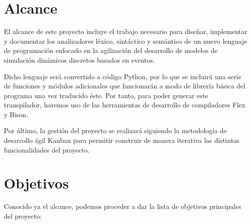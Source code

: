 \section{Alcance}



El alcance de este proyecto incluye el trabajo necesario para diseñar,
implementar y documentar los analizadores léxico, sintáctico y semántico de un
nuevo lenguaje de programación enfocado en la agilización del desarrollo de
modelos de simulación dinámicos discretos basados en eventos.


Dicho lenguaje será convertido a código Python, por lo que se incluirá una serie
de funciones y módulos adicionales que funcionarán a modo de librería básica del
programa una vez traducido éste. Por tanto, para poder generar este
transpilador, haremos uso de las herramientas de desarrollo de compiladores Flex
y Bison.


Por último, la gestión del proyecto se realizará siguiendo la metodología de
desarrollo ágil Kanban para permitir construir de manera iterativa las distintas
funcionalidades del proyecto. 

\section{Objetivos}

Conocido ya el alcance, podemos proceder a dar la lista de objetivos principales
del proyecto: 

